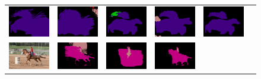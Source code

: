 \begin{figure}[p]
{\begin{tabular}{c c c c c c}
    \includegraphics[height=0.122\linewidth]{fig/val_crf_vis/adaweak/2007_002852.png} &
    \includegraphics[height=0.122\linewidth]{fig/val_crf_vis/bbox/2007_002852.png} &
    \includegraphics[height=0.122\linewidth]{fig/val_crf_vis/bbox_crf/2007_002852.png} &
    \includegraphics[height=0.122\linewidth]{fig/val_crf_vis/strongweak/2007_002852.png} &
    \includegraphics[height=0.122\linewidth]{fig/val_crf_vis/cocomix/2007_002852.png} \\
    \includegraphics[height=0.11\linewidth]{fig/val_crf_vis/img/2007_003022.jpg} &
    \includegraphics[height=0.11\linewidth]{fig/val_crf_vis/adaweak/2007_003022.png} &
    \includegraphics[height=0.11\linewidth]{fig/val_crf_vis/bbox/2007_003022.png} &
    \includegraphics[height=0.11\linewidth]{fig/val_crf_vis/bbox_crf/2007_003022.png} &

\end{tabular}}
\end{figure}

